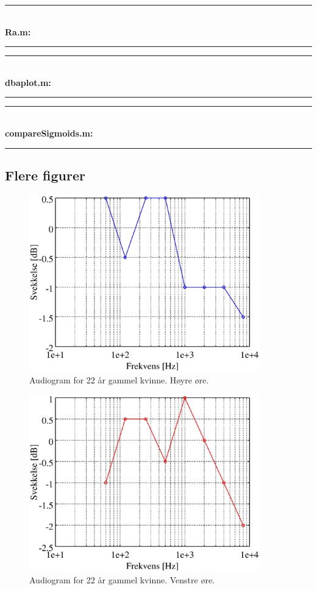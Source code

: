 \documentclass[norsk, twocolumn,letterpaper,11pt,fleqn]{extarticle}
\begin{document}
\rule{5cm}{0.1px}\\
{\bf Ra.m:}


\rule{5cm}{0.1px}

\rule{5cm}{0.1px}\\
{\bf dbaplot.m:}


\rule{5cm}{0.1px}

\rule{5cm}{0.1px}\\
{\bf compareSigmoids.m:}


\rule{5cm}{0.1px}
\newpage
\subsection{Flere figurer}
\label{sub:vedb}
\begin{figure}[h!]
	\centering
	\includegraphics[width=100mm]{rightear22.eps}
	\caption[]{Audiogram for 22 år gammel kvinne. Høyre øre.}
	\label{fig:6}
\end{figure}
\begin{figure}[h!]
	\centering
	\includegraphics[width=100mm]{leftear22.eps}
	\caption[]{Audiogram for 22 år gammel kvinne. Venstre øre.}
	\label{fig:7}
\end{figure}
\end{document}
